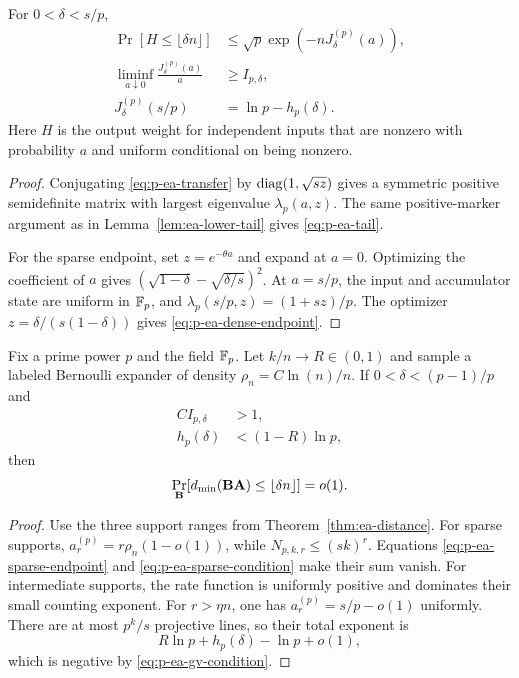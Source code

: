 \begin{lemma}
\label{lem:p-ea-endpoints}
For $0<\delta<s/p$,
\begin{align}
 \Pr[H\leq\lfloor\delta n\rfloor]
 &\leq\sqrt p\exp(-nJ^{(p)}_\delta(a)),
 \label{eq:p-ea-tail}\\
 \liminf_{a\downarrow0}\frac{J^{(p)}_\delta(a)}a
 &\geq I_{p,\delta},
 \label{eq:p-ea-sparse-endpoint}\\
 J^{(p)}_\delta(s/p)&=\ln p-h_p(\delta).
 \label{eq:p-ea-dense-endpoint}
\end{align}
Here $H$ is the output weight for independent inputs that are nonzero with
probability $a$ and uniform conditional on being nonzero.
\end{lemma}

\begin{proof}
Conjugating \eqref{eq:p-ea-transfer} by
$\operatorname{diag}(1,\sqrt{sz})$ gives a symmetric positive semidefinite matrix with
largest eigenvalue $\lambda_p(a,z)$.  The same positive-marker argument as in
Lemma~\ref{lem:ea-lower-tail} gives \eqref{eq:p-ea-tail}.

For the sparse endpoint, set $z=e^{-\theta a}$ and expand at $a=0$.
Optimizing the coefficient of $a$ gives
$(\sqrt{1-\delta}-\sqrt{\delta/s})^2$.  At $a=s/p$, the input and accumulator
state are uniform in $\mathbb F_p$, and
$\lambda_p(s/p,z)=(1+sz)/p$.  The optimizer
$z=\delta/(s(1-\delta))$ gives \eqref{eq:p-ea-dense-endpoint}.
\end{proof}

\begin{theorem}
\label{thm:p-ea-distance}
Fix a prime power $p$ and the field $\mathbb F_p$.  Let $k/n\to R\in(0,1)$ and sample a labeled Bernoulli
expander of density $\rho_n=C\ln(n)/n$.  If
$0<\delta<(p-1)/p$ and
\begin{align}
 C I_{p,\delta}&>1,
 \label{eq:p-ea-sparse-condition}\\
 h_p(\delta)&<(1-R)\ln p,
 \label{eq:p-ea-gv-condition}
\end{align}
then
\begin{equation}
 \Pr_{\mathbf B}[d_{\min}(\mathbf B\mathbf A)\leq\lfloor\delta n\rfloor]=o(1).
 \label{eq:p-ea-distance-conclusion}
\end{equation}
\end{theorem}

\begin{proof}
Use the three support ranges from Theorem~\ref{thm:ea-distance}.  For sparse
supports, $a^{(p)}_r=r\rho_n(1-o(1))$, while
$N_{p,k,r}\leq(sk)^r$.  Equations \eqref{eq:p-ea-sparse-endpoint} and
\eqref{eq:p-ea-sparse-condition} make their sum vanish.  For intermediate
supports, the rate function is uniformly positive and dominates their small
counting exponent.  For $r>\eta n$, one has
$a^{(p)}_r=s/p-o(1)$ uniformly.  There are at most $p^k/s$ projective lines,
so their total exponent is
\[
 R\ln p+h_p(\delta)-\ln p+o(1),
\]
which is negative by \eqref{eq:p-ea-gv-condition}.
\end{proof}

